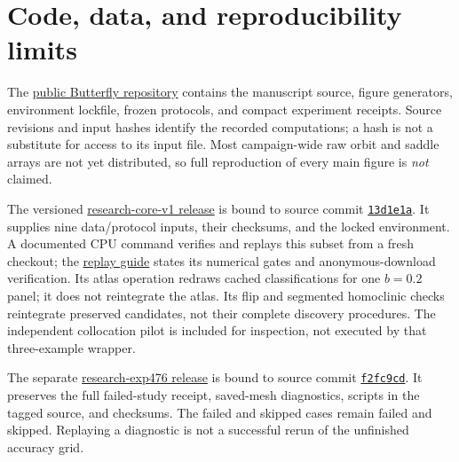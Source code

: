 \section{Code, data, and reproducibility limits}
\label{sec:availability}

The \href{https://github.com/tdj28/butterfly}{public Butterfly repository}
contains the manuscript source, figure generators, environment lockfile,
frozen protocols, and compact experiment receipts. Source revisions and
input hashes identify the recorded computations; a hash is not a substitute
for access to its input file. Most campaign-wide raw orbit and saddle arrays
are not yet distributed, so full reproduction of every main figure is
\emph{not} claimed.

The versioned
\href{https://github.com/tdj28/butterfly/releases/tag/research-core-v1}{research-core-v1 release}
is bound to source commit
\href{https://github.com/tdj28/butterfly/commit/13d1e1aa3a079704b26b372e110614c774b0793d}{\texttt{13d1e1a}}.
It supplies nine data/protocol inputs, their checksums, and the locked
environment. A documented CPU command verifies and replays this subset
from a fresh checkout; the
\href{https://github.com/tdj28/butterfly/blob/main/docs/reproducibility.md}{replay guide}
states its numerical gates and anonymous-download verification.
Its atlas operation redraws cached classifications for one $b=0.2$ panel;
it does not reintegrate the atlas. Its flip and segmented homoclinic checks
reintegrate preserved candidates, not their complete discovery procedures.
The independent collocation pilot is included for inspection, not executed
by that three-example wrapper.

The separate
\href{https://github.com/tdj28/butterfly/releases/tag/research-exp476}{research-exp476 release}
is bound to source commit
\href{https://github.com/tdj28/butterfly/commit/f2fc9cd0885c8343e017a0b46238dff922b89ec7}{\texttt{f2fc9cd}}.
It preserves the full failed-study receipt, saved-mesh diagnostics, scripts
in the tagged source, and checksums. The failed and skipped cases remain
failed and skipped. Replaying a diagnostic is not a successful rerun of the
unfinished accuracy grid.

